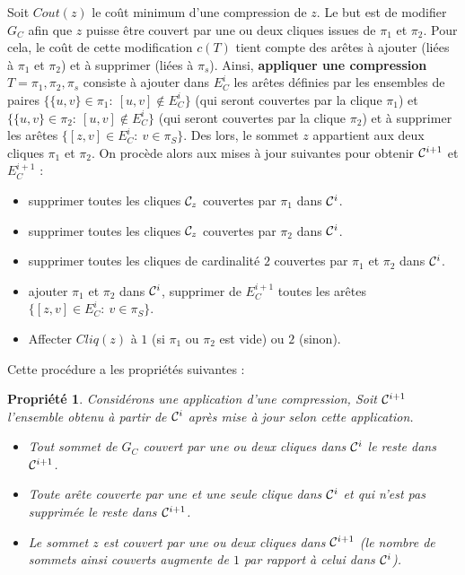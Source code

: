 \documentclass[onecolumn, 12pt]{book}
\newtheorem{property}{Propri\'et\'e}
\begin{document}
Soit  $Cout(z)$ le co\^ut minimum d'une compression de $z$.
Le but est de modifier $G_C$ afin que $z$ puisse \^etre couvert par une ou deux cliques issues de $\pi_1$ et $\pi_2$.
Pour cela, le co\^ut de cette modification $c(T)$ tient compte des ar\^etes \`a ajouter (li\'ees \`a $\pi_1$ et $\pi_2$) et \`a supprimer (li\'ees \`a $\pi_s$).
\newline
Ainsi, {\bf appliquer une compression} $T = \pi_1, \pi_2, \pi_s$ consiste \`a ajouter dans $E_C^i$ les ar\^etes d\'efinies par les ensembles de paires $\{\{u,v\} \in \pi_1:~[u,v]\not\in E_{C}^{i}\}$ (qui seront couvertes par la clique $\pi_1$) et $\{\{u,v\} \in \pi_2:~[u,v]\not\in  E_{C}^{i}\}$ (qui seront couvertes par la clique $\pi_2$) et \`a supprimer les ar\^etes $\{[z,v] \in  E_{C}^{i}:~v\in \pi_S\}$. 
\newline
Des lors, le sommet $z$ appartient aux deux cliques $\pi_1$ et $\pi_2$.
On proc\`ede alors aux mises \`a jour suivantes pour obtenir ${\cal C}^{i+1}$ et $E_C^{i+1}$ :
\begin{itemize}
\item supprimer toutes les cliques ${\cal C}_z$ couvertes par $\pi_1$ dans  ${\cal C}^{i}$.
\item supprimer toutes les cliques ${\cal C}_z$ couvertes par $\pi_2$ dans  ${\cal C}^{i}$.
\item supprimer toutes les cliques de cardinalit\'e $2$ couvertes par $\pi_1$ et $\pi_2$ dans  ${\cal C}^{i}$.
\item ajouter $\pi_1$ et $\pi_2$ dans ${\cal C}^{i}$, supprimer de $E_C^{i+1}$ toutes les ar\^etes  $\{[z,v] \in E_C^{i}:~v\in \pi_S\}$.
\item Affecter $Cliq(z)$ \`a $1$ (si $\pi_1$  ou $\pi_2$ est vide) ou $2$ (sinon).
\end{itemize}
Cette proc\'edure a les propri\'et\'es suivantes :
\begin{property}
Consid\'erons une application d'une compression,
Soit ${\cal C}^{i+1}$  l'ensemble obtenu \`a partir de ${\cal C}^{i}$ apr\`es  mise \`a jour selon cette application.
\begin{itemize}
	\item Tout sommet de $G_C$ couvert par une ou deux cliques dans ${\cal C}^{i}$ le reste dans ${\cal C}^{i+1}$.
	\item Toute ar\^ete couverte par une et une seule clique dans ${\cal C}^{i}$ et qui n'est pas supprim\'ee le reste dans ${\cal C}^{i+1}$.
	\item Le sommet $z$ est couvert par une ou deux cliques dans ${\cal C}^{i+1}$ (le nombre de sommets ainsi couverts augmente de $1$ par rapport \`a celui dans ${\cal C}^{i}$).
\end{itemize}
\end{property}
\end{document}
